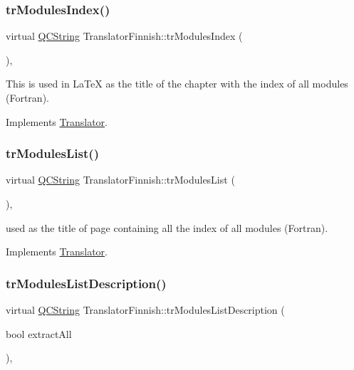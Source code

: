\subsubsection{\texorpdfstring{trModulesIndex()}{trModulesIndex()}}
{\footnotesize\ttfamily virtual \mbox{\hyperlink{class_q_c_string}{Q\+C\+String}} Translator\+Finnish\+::tr\+Modules\+Index (\begin{DoxyParamCaption}{ }\end{DoxyParamCaption})\hspace{0.3cm}{\ttfamily [inline]}, {\ttfamily [virtual]}}

This is used in La\+TeX as the title of the chapter with the index of all modules (Fortran). 

Implements \mbox{\hyperlink{class_translator}{Translator}}.

\mbox{\label{class_translator_finnish_ac5a9cdd768bfa7cd6d0024054fb44c35}} 
\subsubsection{\texorpdfstring{trModulesList()}{trModulesList()}}
{\footnotesize\ttfamily virtual \mbox{\hyperlink{class_q_c_string}{Q\+C\+String}} Translator\+Finnish\+::tr\+Modules\+List (\begin{DoxyParamCaption}{ }\end{DoxyParamCaption})\hspace{0.3cm}{\ttfamily [inline]}, {\ttfamily [virtual]}}

used as the title of page containing all the index of all modules (Fortran). 

Implements \mbox{\hyperlink{class_translator}{Translator}}.

\mbox{\label{class_translator_finnish_a2c929fa512aa2d3452265f8539f88708}} 
\subsubsection{\texorpdfstring{trModulesListDescription()}{trModulesListDescription()}}
{\footnotesize\ttfamily virtual \mbox{\hyperlink{class_q_c_string}{Q\+C\+String}} Translator\+Finnish\+::tr\+Modules\+List\+Description (\begin{DoxyParamCaption}\item[{bool}]{extract\+All }\end{DoxyParamCaption})\hspace{0.3cm}{\ttfamily [inline]}, {\ttfamily [virtual]}}

